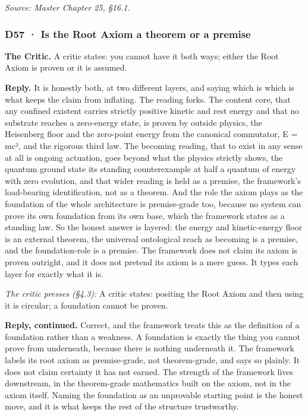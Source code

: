\documentclass[10pt,twocolumn]{article}
\begin{document}
\emph{Source: Master Chapter 25, §16.1.}

\hypertarget{d57-is-the-root-axiom-a-theorem-or-a-premise}{%
\subsubsection{D57 · Is the Root Axiom a theorem or a
premise}\label{d57-is-the-root-axiom-a-theorem-or-a-premise}}

\textbf{The Critic.} A critic states: you cannot have it both ways;
either the Root Axiom is proven or it is assumed.

\textbf{Reply.} It is honestly both, at two different layers, and saying
which is which is what keeps the claim from inflating. The reading
forks. The content core, that any confined existent carries strictly
positive kinetic and rest energy and that no substrate reaches a
zero-energy state, is proven by outside physics, the Heisenberg floor
and the zero-point energy from the canonical commutator, E = mc², and
the rigorous third law. The becoming reading, that to exist in any sense
at all is ongoing actuation, goes beyond what the physics strictly
shows, the quantum ground state its standing counterexample at half a
quantum of energy with zero evolution, and that wider reading is held as
a premise, the framework's load-bearing identification, not as a
theorem. And the role the axiom plays as the foundation of the whole
architecture is premise-grade too, because no system can prove its own
foundation from its own base, which the framework states as a standing
law. So the honest answer is layered: the energy and kinetic-energy
floor is an external theorem, the universal ontological reach as
becoming is a premise, and the foundation-role is a premise. The
framework does not claim its axiom is proven outright, and it does not
pretend its axiom is a mere guess. It types each layer for exactly what
it is.

\emph{The critic presses (§4.3):} A critic states: positing the Root
Axiom and then using it is circular; a foundation cannot be proven.

\textbf{Reply, continued.} Correct, and the framework treats this as the
definition of a foundation rather than a weakness. A foundation is
exactly the thing you cannot prove from underneath, because there is
nothing underneath it. The framework labels its root axiom as
premise-grade, not theorem-grade, and says so plainly. It does not claim
certainty it has not earned. The strength of the framework lives
downstream, in the theorem-grade mathematics built on the axiom, not in
the axiom itself. Naming the foundation as an unprovable starting point
is the honest move, and it is what keeps the rest of the structure
trustworthy.
\end{document}
